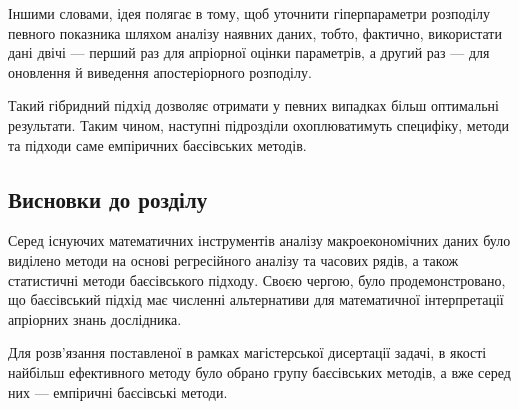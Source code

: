 Іншими словами, ідея полягає в тому, щоб уточнити гіперпараметри розподілу певного показника шляхом аналізу наявних даних, тобто, фактично, використати дані двічі --- перший раз для апріорної оцінки параметрів, а другий раз --- для оновлення й виведення апостеріорного розподілу. 

Такий гібридний підхід дозволяє отримати у певних випадках більш оптимальні результати. Таким чином, наступні підрозділи охоплюватимуть специфіку, методи та підходи саме емпіричних баєсівських методів.

\subsection*{Висновки до розділу}

Серед існуючих математичних інструментів аналізу макроекономічних даних було виділено методи на основі регресійного аналізу та часових рядів, а також статистичні методи баєсівського підходу. Своєю чергою, було продемонстровано, що баєсівський підхід має численні альтернативи для математичної інтерпретації апріорних знань дослідника. 

Для розв'язання поставленої в рамках магістерської дисертації задачі, в якості найбільш ефективного методу було обрано групу баєсівських методів, а вже серед них --- емпіричні баєсівські методи.